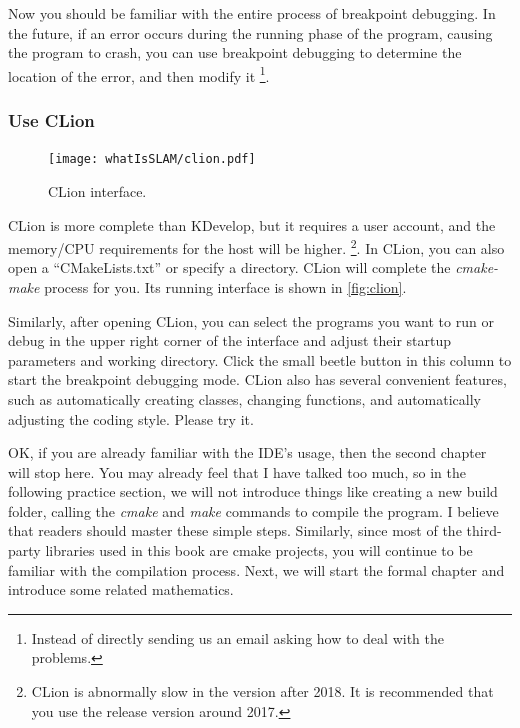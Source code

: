 Now you should be familiar with the entire process of breakpoint debugging. In the future, if an error occurs during the running phase of the program, causing the program to crash, you can use breakpoint debugging to determine the location of the error, and then modify it \footnote{Instead of directly sending us an email asking how to deal with the problems. }.

\subsubsection{Use CLion}
\begin{figure}[!t]
    \centering
    \texttt{[image: whatIsSLAM/clion.pdf]}
    \caption{CLion interface.}
    \label{fig:clion}
\end{figure}

CLion is more complete than KDevelop, but it requires a user account, and the memory/CPU requirements for the host will be higher. \footnote{CLion is abnormally slow in the version after 2018. It is recommended that you use the release version around 2017. }. In CLion, you can also open a ``CMakeLists.txt'' or specify a directory. CLion will complete the \textit{cmake-make} process for you. Its running interface is shown in \autoref{fig:clion}.

Similarly, after opening CLion, you can select the programs you want to run or debug in the upper right corner of the interface and adjust their startup parameters and working directory. Click the small beetle button in this column to start the breakpoint debugging mode. CLion also has several convenient features, such as automatically creating classes, changing functions, and automatically adjusting the coding style. Please try it.

OK, if you are already familiar with the IDE's usage, then the second chapter will stop here. You may already feel that I have talked too much, so in the following practice section, we will not introduce things like creating a new build folder, calling the \textit{cmake} and \textit{make} commands to compile the program. I believe that readers should master these simple steps. Similarly, since most of the third-party libraries used in this book are cmake projects, you will continue to be familiar with the compilation process. Next, we will start the formal chapter and introduce some related mathematics.


